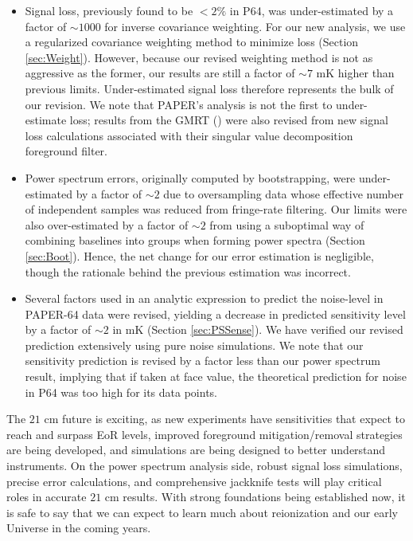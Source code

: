 \documentclass[preprint2,numberedappendix,tighten]{aastex6}  %
\begin{document}
\begin{itemize}
\item Signal loss, previously found to be $<2\%$ in P64, was under-estimated by a factor of $\sim$$1000$ for inverse 
covariance weighting. For our new analysis, we use a regularized covariance weighting method to minimize loss (Section 
\ref{sec:Weight}). However, because our revised weighting method is not as aggressive as the former, our results are still a 
factor of $\sim7$ mK higher than previous limits. Under-estimated signal loss therefore represents the bulk of our revision. We 
note that PAPER's analysis is not the first to under-estimate loss; results from the GMRT (\citealt{paciga_et_al2013}) were also 
revised from new signal loss calculations associated with their singular value decomposition foreground filter.
\item Power spectrum errors, originally computed by bootstrapping, were under-estimated by a factor of $\sim$$2$ due to 
oversampling data whose effective number of independent samples was reduced from fringe-rate filtering. Our limits were also 
over-estimated by a factor of $\sim$$2$ from using a suboptimal way of combining baselines into groups when forming power 
spectra (Section \ref{sec:Boot}). Hence, the net change for our error estimation is negligible, though the rationale behind the 
previous estimation was incorrect.
\item Several factors used in an analytic expression to predict the noise-level in PAPER-64 data were revised, yielding a 
decrease in predicted sensitivity level by a factor of $\sim$$2$ in mK (Section \ref{sec:PSSense}). We have verified our revised 
prediction extensively using pure noise simulations. We note that our sensitivity prediction is revised by a factor less than our 
power spectrum result, implying that if taken at face value, the theoretical prediction for noise in P64 was too high for its data 
points.
\end{itemize}

The $21$ cm future is exciting, as new experiments have sensitivities that expect to reach and surpass EoR levels, improved 
foreground mitigation/removal strategies are being developed, and simulations are being designed to better understand 
instruments. On the power spectrum analysis side, robust signal loss simulations, precise error calculations, and 
comprehensive jackknife tests will play critical roles in accurate $21$ cm results. With strong foundations being established now, it is safe to say that we can expect to learn much about reionization and our early Universe in the coming years.
\end{document}
